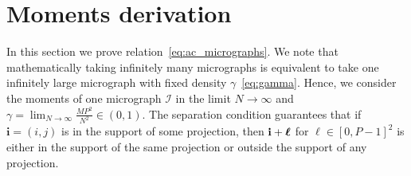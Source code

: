 \documentclass[english,11pt]{article}
\newcommand{\1}{\mathbf{1}}
\newcommand{\II}{\mathcal{I}}
\newcommand{\mb}{\mathbf}
\newcommand*\Bell{\ensuremath{\boldsymbol\ell}}
\numberwithin{equation}{section}
\theoremstyle{plain}
\theoremstyle{definition}
\theoremstyle{remark}
\theoremstyle{plain}
\theoremstyle{remark}
\theoremstyle{plain}
\theoremstyle{plain}
\begin{document}
\section{Moments derivation} \label{sec:moment_derivation}
In this section we prove relation~\eqref{eq:ac_micrographs}. We note that mathematically taking infinitely many micrographs is equivalent to take one infinitely large micrograph with fixed density $\gamma$~\eqref{eq:gamma}. Hence, we consider the moments of one micrograph $\II$ in the limit $N\to\infty$ and  $\gamma = \lim_{N\to\infty}\frac{MP^2}{N^2}\in(0,1)$. %
The separation condition guarantees that if $\mb i=(i,j)$ is in the support of some projection, then $\mb i + \mb \Bell$ for $\Bell\in[0,P-1]^2$ is either in the support of the same projection or outside the support of any projection. %
\end{document}
